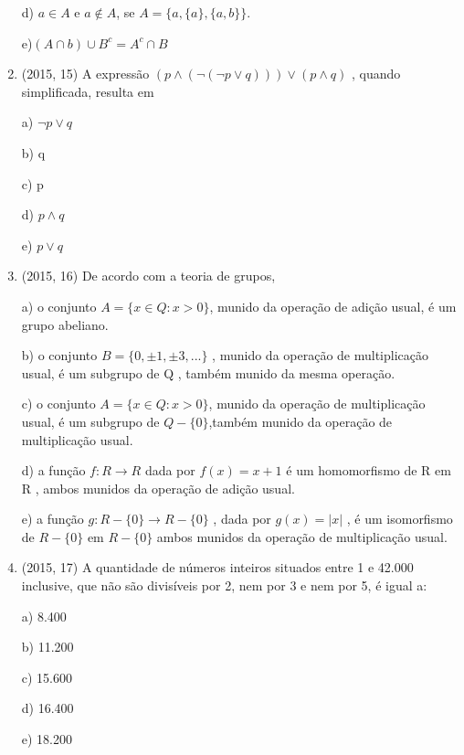\documentclass{article}
\begin{document}
\begin{enumerate}
d) ${a}\in A$ e ${a}\not\in A$, se $A=\{a ,\{a \}, \{a , b\}\}.$

e)$(A\cap b)\cup B^c = A^c \cap  B$ \newline 




\item (2015, 15) A expressão $( p\land(\lnot (\lnot  p\lor q)))\lor( p\land q)$ , quando simplificada, resulta em\newline

a) $\lnot p \lor q$

b) q

c) p

d) $p\land q$

e) $p\lor q$\newline



\item (2015, 16) De acordo com a teoria de grupos,\newline

a) o conjunto $ A=\{  x\in Q: x>0 \}$, munido da operação de adição usual, é um grupo abeliano. 

b) o conjunto $B=\{ 0, \pm 1, \pm3,...\} $ , munido da operação de multiplicação usual, é um subgrupo de Q , também munido da mesma operação.

c) o conjunto $ A=\{  x\in Q: x>0 \}$, munido da operação de multiplicação usual, é um subgrupo de $Q - \{ 0 \}$,também munido da operação de multiplicação usual.

d) a função $f:R \rightarrow R$ dada por $f(x)=x+1$ é um homomorfismo de R em R , ambos munidos da operação de adição usual.

e) a função $ g:R-\{ 0\} \rightarrow R-\{ 0\}$ , dada por $g(x)=|x|$ , é um isomorfismo de  $R-\{ 0\} $
em $R-\{ 0\} $ ambos munidos da operação de multiplicação usual.\newline




\newpage\item (2015, 17) A quantidade de números inteiros situados entre 1 e 42.000 inclusive, que não são divisíveis por 2, nem por 3 e nem por 5, é igual a:\newline

a) 8.400

b) 11.200

c) 15.600

d) 16.400

e) 18.200\newline




\end{enumerate}
\end{document}

